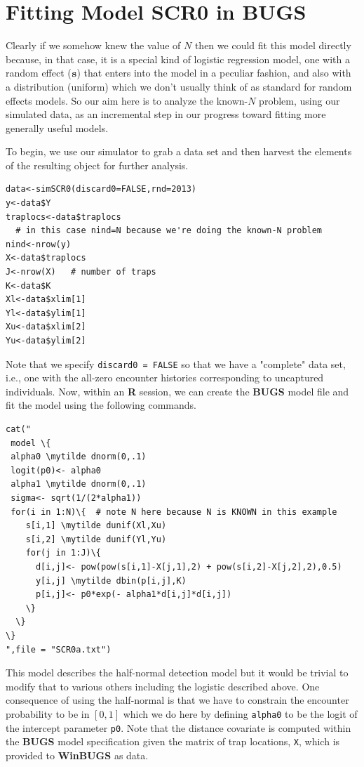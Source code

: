 \section{Fitting Model SCR0 in BUGS}
\label{scr0.sec.winbugs1}

Clearly if we somehow knew the value of $N$ then we could fit this
model directly because, in that case, it is a special kind of logistic
regression model, one with a random effect (${\bf s}$) that enters into the
model in a peculiar fashion, and also with a distribution (uniform)
which we don't usually think of as standard for random effects models.
So our aim here is to analyze the known-$N$ problem, using our
simulated data, as an incremental step in our progress toward fitting
more generally useful models.

To begin, we use our simulator to grab a data set and then harvest the
elements of the resulting object for further analysis.
\begin{verbatim}
data<-simSCR0(discard0=FALSE,rnd=2013)
y<-data$Y
traplocs<-data$traplocs
  # in this case nind=N because we're doing the known-N problem
nind<-nrow(y) 
X<-data$traplocs
J<-nrow(X)   # number of traps
K<-data$K
Xl<-data$xlim[1]
Yl<-data$ylim[1]
Xu<-data$xlim[2]
Yu<-data$ylim[2]
\end{verbatim}

Note that we specify \mbox{\tt discard0 = FALSE} so that we have a
"complete" data set, i.e., one with the all-zero encounter histories
corresponding to uncaptured individuals. Now, within an {\bf R} session, we
can create the {\bf BUGS} model file and fit the model using the following
commands.
{\small
\begin{Verbatim}[commandchars=\\\{\}]
cat("
 model \{
 alpha0 \mytilde dnorm(0,.1)
 logit(p0)<- alpha0
 alpha1 \mytilde dnorm(0,.1)
 sigma<- sqrt(1/(2*alpha1))
 for(i in 1:N)\{  # note N here because N is KNOWN in this example
    s[i,1] \mytilde dunif(Xl,Xu)
    s[i,2] \mytilde dunif(Yl,Yu)    
    for(j in 1:J)\{
      d[i,j]<- pow(pow(s[i,1]-X[j,1],2) + pow(s[i,2]-X[j,2],2),0.5)
      y[i,j] \mytilde dbin(p[i,j],K)
      p[i,j]<- p0*exp(- alpha1*d[i,j]*d[i,j])
    \}
  \}
\}
",file = "SCR0a.txt")
\end{Verbatim}
}
This model describes the half-normal detection model but it
would be trivial to modify that to various others including the
logistic described above. One consequence of using the half-normal is
that we have to constrain the encounter probability to be in $[0,1]$
which we do here by defining \mbox{\tt alpha0} to be the logit of the
intercept parameter \mbox{\tt p0}. Note that the distance covariate is
computed within the {\bf BUGS} model specification given the matrix of trap
locations, \mbox{\tt X}, which is provided to {\bf WinBUGS} as data.

